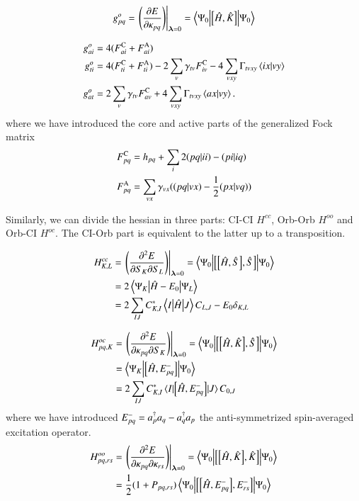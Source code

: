 \documentclass[aps,prb,reprint,showkeys,superscriptaddress]{revtex4-1}
\begin{document}
\begin{equation}
  \label{eq:CASSCF_Orb_Gradient_general}
  g^o_{pq} = \eval{\mleft(\pdv{E}{\kappa_{pq}}\mright)}_{\bm{\lambda}=0} = \mel**{\Psi_0}{\com{\hH}{\hK}}{\Psi_0}
\end{equation}

\begin{subequations}
  \label{eq:CASSCF_Orb_Gradient}
  \begin{align}
    g^o_{ai} &= 4(F_{ai}^{\text{C}} + F_{ai}^{\text{A}}) \\
    g^o_{ti} &= 4(F_{ti}^{\text{C}} + F_{ti}^{\text{A}}) - 2\sum_v \gamma_{tv}F_{iv}^{\text{C}} -4\sum_{vxy}\Gamma_{tvxy}\braket{ix}{vy} \\
    g^o_{at} &= 2\sum_v \gamma_{tv}F_{av}^{\text{C}} + 4\sum_{vxy}\Gamma_{tvxy}\braket{ax}{vy}.
  \end{align}
\end{subequations}
where we have introduced the core and active parts of the generalized Fock matrix
\begin{align}
  \label{eq:CoreActGeneralizedFock}
  \FC{pq} &= h_{pq} + \sum_{i} 2\ceri{pq}{ii} - \ceri{pi}{iq} \\
  \FA{pq} &= \sum_{vx}\gamma_{vx}(\ceri{pq}{vx} - \frac{1}{2}\ceri{px}{vq})
\end{align}

Similarly, we can divide the hessian in three parts: CI-CI $H^{cc}$, Orb-Orb $H^{oo}$ and Orb-CI $H^{oc}$. The CI-Orb part is equivalent to the latter up to a transposition.

\begin{align}
  \label{eq:CASSCF_CICI_Hessian}
  H^{cc}_{K,L} &= \eval{\mleft(\pdv{E}{S_{K}}{S_{L}}\mright)}_{\bm{\lambda}=0} = \mel**{\Psi_0}{\com{\com{\hH}{\hS}}{\hS}}{\Psi_0} \\
  &= 2\mel**{\Psi_K}{\hH - E_0}{\Psi_L} \notag \\
  &= 2\sum_{IJ}C_{K,I}^*\mel**{I}{\hH}{J}C_{L,J} - E_0\delta_{K,L} \notag
\end{align}

\begin{align}
  \label{eq:CASSCF_OrbCI_Hessian}
  H^{oc}_{pq,K} &= \eval{\mleft(\pdv{E}{\kappa_{pq}}{S_{K}}\mright)}_{\bm{\lambda}=0} = \mel**{\Psi_0}{\com{\com{\hH}{\hK}}{\hS}}{\Psi_0} \\
                &= \mel**{\Psi_K}{\com{\hH}{E_{pq}^-}}{\Psi_0} \notag \\
                &= 2\sum_{IJ}C_{K,I}^*\mel{I}{\com{\hH}{E_{pq}^-}}{J}C_{0,J} \notag
\end{align}
where we have introduced $E_{pq}^- = a_{p}^\dagger a_{q} - a_{q}^\dagger a_{p}$ the anti-symmetrized spin-averaged excitation operator.
\begin{align}
  \label{eq:MCSCF_SO_OrbOrb_Hessian}
  H^{oo}_{pq,rs} &= \eval{\mleft(\pdv{E}{\kappa_{pq}}{\kappa_{rs}}\mright)}_{\bm{\lambda}=0} = \mel**{\Psi_0}{\com{\com{\hH}{\hK}}{\hK}}{\Psi_0} \\
                   &= \frac{1}{2}(1+P_{pq,rs})\mel**{\Psi_0}{\com{\com{\hH}{E_{pq}^-}}{E_{rs}^-}}{\Psi_0} \notag
\end{align}


\end{document}
